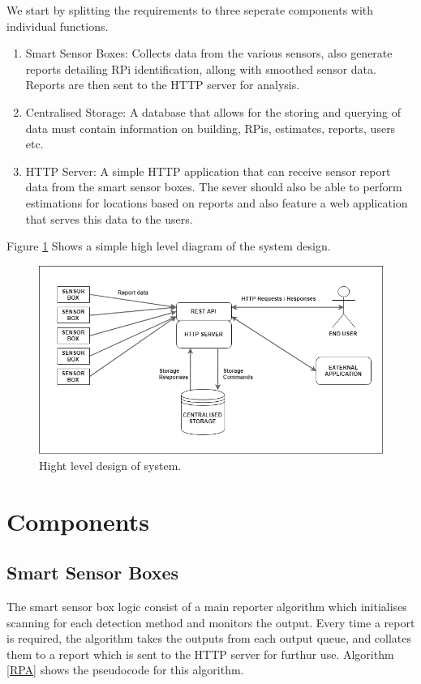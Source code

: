 \documentclass{l4proj}
\begin{document}
We start by splitting the requirements to three seperate components with individual functions.
\begin{enumerate}
  \item Smart Sensor Boxes:
	Collects data from the various sensors, also generate reports detailing RPi identification, allong with smoothed sensor data. Reports are then sent to the HTTP server for analysis. 
  \item Centralised Storage:
	A database that allows for the storing and querying of data must contain information on building, RPis, estimates, reports, users etc.
  \item HTTP Server:
	A simple HTTP application that can receive sensor report data from the smart sensor boxes. The sever should also be able to perform estimations for locations based on reports and also feature a web application that serves this data to the users. 
\end{enumerate}
Figure \ref{fig:overalldiag} Shows a simple high level diagram of the system design.
\begin{figure}
\centering
\includegraphics[width=\textwidth]{overalldiag}
\caption{Hight level design of system.}
\label{fig:overalldiag}
\end{figure}

\section{Components}
\subsection{Smart Sensor Boxes}
The smart sensor box logic consist of a main reporter algorithm which initialises scanning for each detection method and monitors the output. Every time a report is required, the algorithm takes the outputs from each output queue, and collates them to a report which is sent to the HTTP server for furthur use.  Algorithm \ref{RPA} shows the pseudocode for this algorithm.
\end{document}
